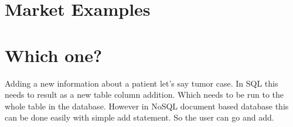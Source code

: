 \documentclass{article}
\begin{document}
\section{Market Examples}

\section{Which one?}
Adding a new information about a patient let's say tumor case. In SQL this needs to result as a new table column addition. Which needs to be run to the whole table in the database. However in NoSQL document based database this can be done easily with simple add statement. So the user can go and add. 



\end{document}
